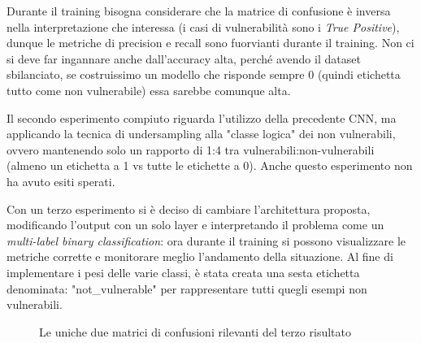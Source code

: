 \documentclass[conference]{IEEEtran}
\begin{document}
Durante il training bisogna considerare che la matrice di confusione è inversa nella interpretazione che interessa (i casi di vulnerabilità sono i \textit{True Positive}), dunque le metriche di precision e recall sono fuorvianti durante il training. Non ci si deve far ingannare anche dall'accuracy alta, perché avendo il dataset sbilanciato, se costruissimo un modello che risponde sempre 0 (quindi etichetta tutto come non vulnerabile) essa sarebbe comunque alta.

Il secondo esperimento compiuto riguarda l'utilizzo della precedente CNN, ma applicando la tecnica di undersampling alla "classe logica" dei non vulnerabili, ovvero mantenendo solo un rapporto di 1:4 tra vulnerabili:non-vulnerabili (almeno un etichetta a 1 vs tutte le etichette a 0). Anche questo esperimento non ha avuto esiti sperati.

Con un terzo esperimento si è deciso di cambiare l'architettura proposta, modificando l'output con un solo layer e interpretando il problema come un \textit{multi-label binary classification}: ora durante il training si possono visualizzare le metriche corrette e monitorare meglio l'andamento della situazione. Al fine di implementare i pesi delle varie classi, è stata creata una sesta etichetta denominata: "not\_vulnerable" per rappresentare tutti quegli esempi non vulnerabili. 

\begin{figure}[H]
    \centering
    \caption{Le uniche due matrici di confusioni rilevanti del terzo risultato}
    \label{fig:confidence_effect}
\end{figure}
\end{document}
